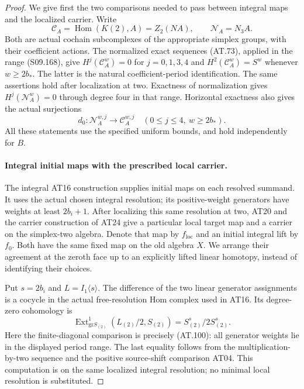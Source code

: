 \begin{proof}
We give first the two comparisons needed to pass between
integral maps and the localized carrier. Write
\[
 \mathcal C_A=\operatorname{Hom}(K(2),A)=Z_2(NA),
                    \qquad \mathcal N_A=N_3A.
\]
Both are actual cochain subcomplexes of the appropriate simplex
groups, with their coefficient actions. The normalized exact
sequences (AT.73), applied in the range (S09.168), give
$H^j(\mathcal C_A^w)=0$ for $j=0,1,3,4$ and
$H^2(\mathcal C_A^w)=S^w$ whenever
$w\geq2b_*$. The latter is the natural coefficient-period
identification. The same assertions hold after localization
at two. Exactness of normalization gives
$H^j(\mathcal N_A^w)=0$ through degree four in that range.
Horizontal exactness also gives the actual surjections
\[
       d_0:\mathcal N_A^{w,j}\longrightarrow\mathcal C_A^{w,j}
                  \quad(0\leq j\leq4,\ w\geq2b_*).
 \tag{S09.169}
\]
All these statements use the specified uniform bounds, and
hold independently for $B$.

\paragraph{Integral initial maps with the prescribed local carrier.}
The integral AT16 construction supplies initial maps on each
resolved summand. It uses the actual chosen integral resolution;
its positive-weight generators have weights at least $2b_i+1$.
After localizing this same resolution at two, AT20 and the
carrier construction of AT24 give a particular local target
map and a carrier on the simplex-two algebra. Denote that map
by $f_{\mathrm{loc}}$ and an initial integral lift by $f_0$.
Both have the same fixed map on the old algebra $X$.
We arrange their agreement at the zeroth face up to an explicitly
lifted linear homotopy, instead of identifying their choices.

Put $s=2b_i$ and $L=I_1\langle s\rangle$.
The difference of the two linear generator assignments is a
cocycle in the actual free-resolution Hom complex used in AT16.
Its degree-zero cohomology is
\[
 \operatorname{Ext}^1_{\mathrm{gr}S_{(2)}}(L_{(2)}/2,S_{(2)})
                       =S_{(2)}^s/2S_{(2)}^s.
 \tag{S09.170}
\]
Here the finite-diagonal comparison is precisely (AT.100):
all generator weights lie in the displayed period range.
The last equality follows from the multiplication-by-two
sequence and the positive source-shift comparison AT04.
This computation is on the same localized integral resolution;
no minimal local resolution is substituted.


\end{proof}
